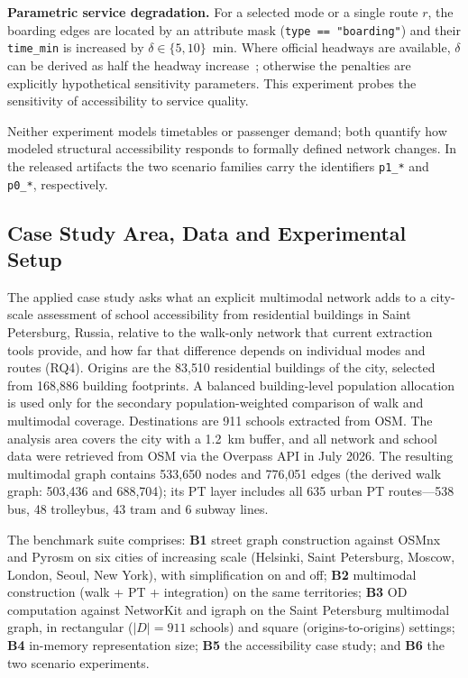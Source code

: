 \documentclass[smartcities,article,submit,moreauthors]{Definitions/mdpi}
\begin{document}
    \textbf{Parametric service degradation.}
    For a selected mode or a single route $r$, the boarding edges are located by an attribute mask
    (\texttt{type == "boarding"}) and their \texttt{time\_min} is
    increased by $\delta \in \{5, 10\}$~min.
    Where official headways are available, $\delta$ can be derived as half the headway
    increase~\cite{gogousou2026mobilityoracle}; otherwise the penalties are explicitly hypothetical
    sensitivity parameters.
    This experiment probes the sensitivity of accessibility to service quality.

    Neither experiment models timetables or passenger demand; both quantify how modeled structural
    accessibility responds to formally defined network changes.
    In the released artifacts the two scenario families carry the identifiers \texttt{p1\_*} and
    \texttt{p0\_*}, respectively.

    \subsection{Case Study Area, Data and Experimental Setup}
    \label{subsec:setup}

    The applied case study asks what an explicit multimodal network adds to a city-scale assessment of
    school accessibility from residential buildings in Saint Petersburg, Russia, relative to the
    walk-only network that current extraction tools provide, and how far that difference depends on
    individual modes and routes (RQ4).
    Origins are the 83{,}510 residential buildings of the city, selected from 168{,}886 building
    footprints. A balanced building-level population allocation is used only for the secondary
    population-weighted comparison of walk and multimodal coverage.
    Destinations are 911 schools extracted from OSM.
    The analysis area covers the city with a 1.2~km buffer, and all network and school data were
    retrieved from OSM via the Overpass API in July 2026.
    The resulting multimodal graph contains 533{,}650 nodes and 776{,}051 edges (the derived walk
    graph: 503{,}436 and 688{,}704); its PT layer includes all 635 urban PT routes---538 bus, 48
    trolleybus, 43 tram and 6 subway lines.

    The benchmark suite comprises: \textbf{B1} street graph construction against OSMnx and Pyrosm on
    six cities of increasing scale (Helsinki, Saint Petersburg, Moscow, London, Seoul, New York), with
    simplification on and off; \textbf{B2} multimodal construction (walk + PT + integration) on the same
    territories; \textbf{B3} OD computation against NetworKit and igraph on the Saint Petersburg
    multimodal graph, in rectangular ($|D| = 911$ schools) and square (origins-to-origins) settings;
    \textbf{B4} in-memory representation size; \textbf{B5} the accessibility case study; and \textbf{B6}
    the two scenario experiments.
\end{document}
